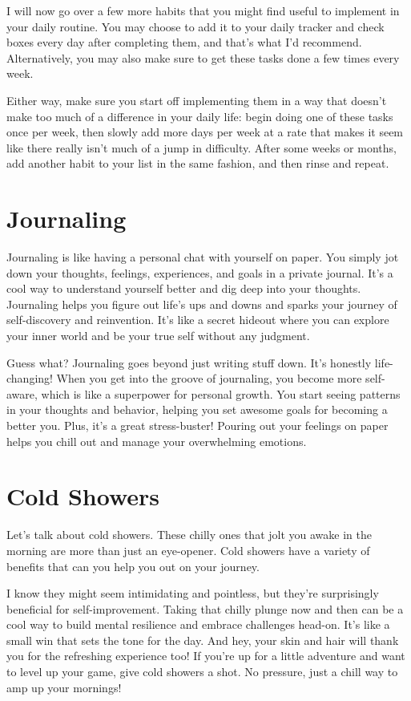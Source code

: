 \documentclass[
]{book}
\begin{document}
I will now go over a few more habits that you might find useful to implement in your daily routine. You may choose to add it to your daily tracker and check boxes every day after completing them, and that's what I'd recommend. Alternatively, you may also make sure to get these tasks done a few times every week.

Either way, make sure you start off implementing them in a way that doesn't make too much of a difference in your daily life: begin doing one of these tasks once per week, then slowly add more days per week at a rate that makes it seem like there really isn't much of a jump in difficulty. After some weeks or months, add another habit to your list in the same fashion, and then rinse and repeat.

\hypertarget{journaling}{%
\section{Journaling}\label{journaling}}

Journaling is like having a personal chat with yourself on paper. You simply jot down your thoughts, feelings, experiences, and goals in a private journal. It's a cool way to understand yourself better and dig deep into your thoughts. Journaling helps you figure out life's ups and downs and sparks your journey of self-discovery and reinvention. It's like a secret hideout where you can explore your inner world and be your true self without any judgment.

Guess what? Journaling goes beyond just writing stuff down. It's honestly life-changing! When you get into the groove of journaling, you become more self-aware, which is like a superpower for personal growth. You start seeing patterns in your thoughts and behavior, helping you set awesome goals for becoming a better you. Plus, it's a great stress-buster! Pouring out your feelings on paper helps you chill out and manage your overwhelming emotions.

\hypertarget{cold-showers}{%
\section{Cold Showers}\label{cold-showers}}

Let's talk about cold showers. These chilly ones that jolt you awake in the morning are more than just an eye-opener. Cold showers have a variety of benefits that can you help you out on your journey.

I know they might seem intimidating and pointless, but they're surprisingly beneficial for self-improvement. Taking that chilly plunge now and then can be a cool way to build mental resilience and embrace challenges head-on. It's like a small win that sets the tone for the day. And hey, your skin and hair will thank you for the refreshing experience too! If you're up for a little adventure and want to level up your game, give cold showers a shot. No pressure, just a chill way to amp up your mornings!
\end{document}
